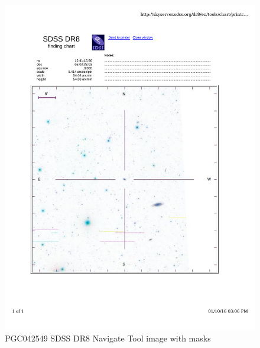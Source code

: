 \documentclass[10pt,letterpaper]{article}
\begin{document}
\begin{figure}[h!]
\centering
\includegraphics[scale=0.7]{figures/PGC042549.pdf}
\caption{PGC042549 SDSS DR8 Navigate Tool image with masks}
\end{figure}
\end{document}
